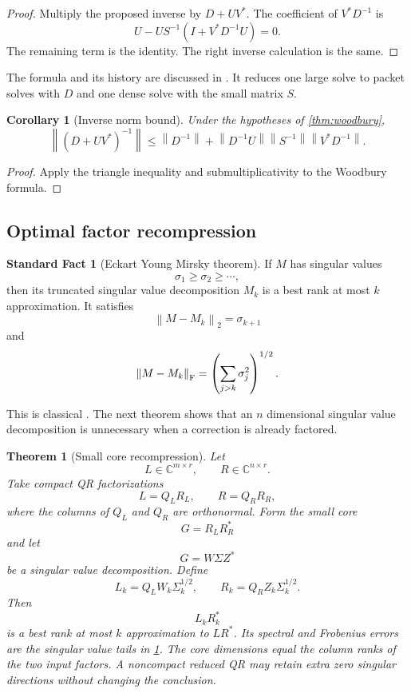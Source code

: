 \documentclass{aomart}
\newtheorem{theorem}{Theorem}[section]
\newtheorem{corollary}[corollary]{Corollary}
\theoremstyle{definition}
\newtheorem{standardfact}[standardfact]{Standard Fact}
\theoremstyle{remark}
\newcommand{\CC}{\mathbb C}
\newcommand{\norm}[1]{\left\lVert#1\right\rVert}
\begin{document}
\begin{proof}
Multiply the proposed inverse by \(D+UV^*\). The coefficient of \(V^*D^{-1}\) is
\[
U-US^{-1}(I+V^*D^{-1}U)=0.
\]
The remaining term is the identity. The right inverse calculation is the same.
\end{proof}

The formula and its history are discussed in \cite{Hager1989}. It reduces one large solve to packet solves with \(D\) and one dense solve with the small matrix \(S\).

\begin{corollary}[Inverse norm bound]\label{cor:inverse_norm}
Under the hypotheses of \cref{thm:woodbury},
\[
\norm{(D+UV^*)^{-1}}
\leq
\norm{D^{-1}}
+
\norm{D^{-1}U}
\norm{S^{-1}}
\norm{V^*D^{-1}}.
\]
\end{corollary}

\begin{proof}
Apply the triangle inequality and submultiplicativity to the Woodbury formula.
\end{proof}

\subsection{Optimal factor recompression}

\begin{standardfact}[Eckart Young Mirsky theorem]\label{fact:eym}
If \(M\) has singular values
\[
\sigma_1\geq\sigma_2\geq\cdots,
\]
then its truncated singular value decomposition \(M_k\) is a best rank at most \(k\) approximation. It satisfies
\[
\norm{M-M_k}_2=\sigma_{k+1}
\]
and
\[
\norm{M-M_k}_{\rm F}
=
\left(
\sum_{j>k}\sigma_j^2
\right)^{1/2}.
\]
\end{standardfact}

This is classical \cite{EckartYoung1936,Mirsky1960}. The next theorem shows that an \(n\) dimensional singular value decomposition is unnecessary when a correction is already factored.

\begin{theorem}[Small core recompression]\label{thm:small_core_recompression}
Let
\[
L\in\CC^{m\times r},
\qquad
R\in\CC^{n\times r}.
\]
Take compact QR factorizations
\[
L=Q_LR_L,
\qquad
R=Q_RR_R,
\]
where the columns of \(Q_L\) and \(Q_R\) are orthonormal. Form the small core
\[
G=R_LR_R^*
\]
and let
\[
G=W\Sigma Z^*
\]
be a singular value decomposition. Define
\[
L_k=Q_LW_k\Sigma_k^{1/2},
\qquad
R_k=Q_RZ_k\Sigma_k^{1/2}.
\]
Then
\[
L_kR_k^*
\]
is a best rank at most \(k\) approximation to \(LR^*\). Its spectral and Frobenius errors are the singular value tails in \cref{fact:eym}. The core dimensions equal the column ranks of the two input factors. A noncompact reduced QR may retain extra zero singular directions without changing the conclusion.
\end{theorem}
\end{document}
